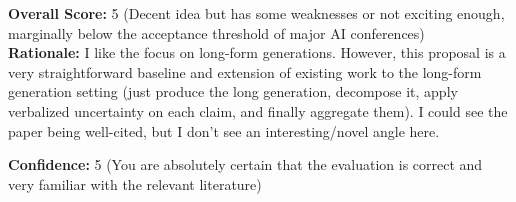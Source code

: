\begin{tcolorbox}[colback=green!10!white, colframe=green!80!black, title=\textbf{Reviewer 1}]
\vspace{10pt}

\textbf{Overall Score:} 5 (Decent idea but has some weaknesses or not exciting enough, marginally below the acceptance threshold of major AI conferences)\\
\textbf{Rationale:} I like the focus on long-form generations. However, this proposal is a very straightforward baseline and extension of existing work to the long-form generation setting (just produce the long generation, decompose it, apply verbalized uncertainty on each claim, and finally aggregate them). I could see the paper being well-cited, but I don't see an interesting/novel angle here.

\vspace{10pt}

\textbf{Confidence:} 5 (You are absolutely certain that the evaluation is correct and very familiar with the relevant literature)
\end{tcolorbox}

\newpage


